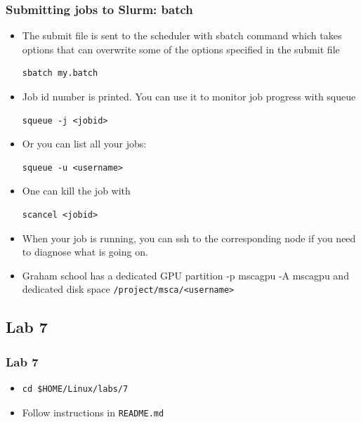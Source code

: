 \documentclass{beamer}
\begin{document}
\begin{frame}[fragile]
  \frametitle{Submitting jobs to Slurm: batch}
  \begin{itemize}
  \item The submit file is sent to the scheduler with sbatch command which takes options 
    that can overwrite some of the options specified in the submit file
        {\color{mycolorcli}
\begin{verbatim}
sbatch my.batch
\end{verbatim}
        }
      \item Job id number is printed. You can use it to monitor job progress with squeue
        {\color{mycolorcli}
\begin{verbatim}
squeue -j <jobid>
\end{verbatim}
        }
      \item Or you can list all your jobs:
        {\color{mycolorcli}
\begin{verbatim}
squeue -u <username>
\end{verbatim}
        }
      \item One can kill the job with
{\color{mycolorcli}
\begin{verbatim}
scancel <jobid>
\end{verbatim}
        }
      \item When your job is running, you can ssh to the corresponding node if you need to diagnose what is going on.
      \item Graham school has a dedicated GPU partition {\color{mycolorcli}-p mscagpu -A mscagpu} and dedicated
        disk space {\color{mycolorcli}\verb|/project/msca/<username>|}
  \end{itemize}
\end{frame}  

\subsection{Lab 7}
\begin{frame}[fragile]
  \frametitle{Lab 7}
\begin{itemize}
\item
{\color{mycolorcli}
\begin{verbatim}
cd $HOME/Linux/labs/7
\end{verbatim}
}
\item Follow instructions in {\color{mycolorcli}\verb|README.md|}
\end{itemize}

\end{frame}
\end{document}
